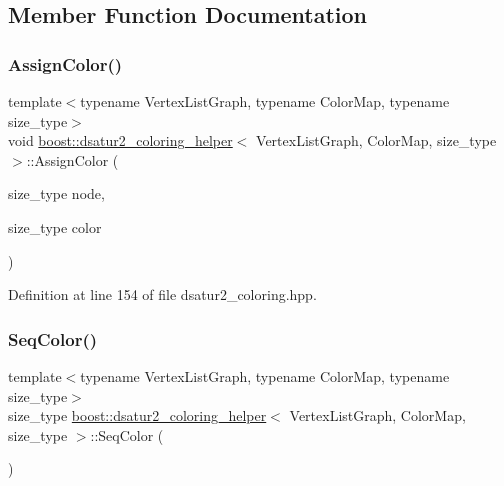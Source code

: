 \subsection{Member Function Documentation}
\mbox{\label{classboost_1_1dsatur2__coloring__helper_adb927efbacd307f3279d5a6bdd198700}} 
\subsubsection{\texorpdfstring{Assign\+Color()}{AssignColor()}}
{\footnotesize\ttfamily template$<$typename Vertex\+List\+Graph, typename Color\+Map, typename size\+\_\+type$>$ \\
void \hyperlink{classboost_1_1dsatur2__coloring__helper}{boost\+::dsatur2\+\_\+coloring\+\_\+helper}$<$ Vertex\+List\+Graph, Color\+Map, size\+\_\+type $>$\+::Assign\+Color (\begin{DoxyParamCaption}\item[{size\+\_\+type}]{node,  }\item[{size\+\_\+type}]{color }\end{DoxyParamCaption})\hspace{0.3cm}{\ttfamily [inline]}}



Definition at line 154 of file dsatur2\+\_\+coloring.\+hpp.

\mbox{\label{classboost_1_1dsatur2__coloring__helper_a0abb8144cff9aa7d05b8bad12b84158c}} 
\subsubsection{\texorpdfstring{Seq\+Color()}{SeqColor()}}
{\footnotesize\ttfamily template$<$typename Vertex\+List\+Graph, typename Color\+Map, typename size\+\_\+type$>$ \\
size\+\_\+type \hyperlink{classboost_1_1dsatur2__coloring__helper}{boost\+::dsatur2\+\_\+coloring\+\_\+helper}$<$ Vertex\+List\+Graph, Color\+Map, size\+\_\+type $>$\+::Seq\+Color (\begin{DoxyParamCaption}{ }\end{DoxyParamCaption})\hspace{0.3cm}{\ttfamily [inline]}}

